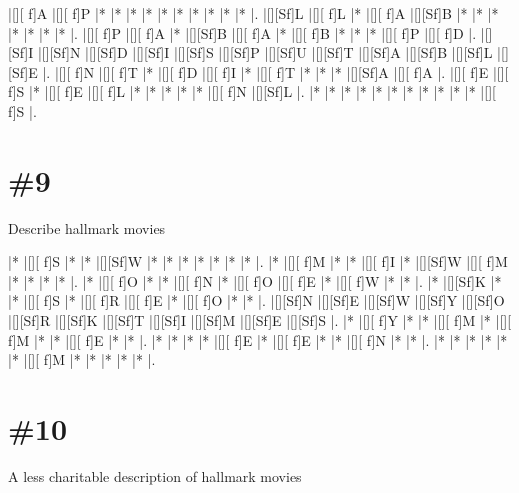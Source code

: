 \documentclass[letterpaper]{article}
\begin{document}
\vspace*{1em}
\begin{Puzzle}{12}{7}
|[][ f]A  |[][ f]P  |*        |*        |*        |*        |*        |*        |*        |*        |*        |*        |.  
|[][Sf]L  |[][ f]L  |*        |[][ f]A  |[][Sf]B  |*        |*        |*        |*        |*        |*        |*        |.
|[][ f]P  |[][ f]A  |*        |[][Sf]B  |[][ f]A  |*        |[][ f]B  |*        |*        |*        |[][ f]P  |[][ f]D  |.  
|[][Sf]I  |[][Sf]N  |[][Sf]D  |[][Sf]I  |[][Sf]S  |[][Sf]P  |[][Sf]U  |[][Sf]T  |[][Sf]A  |[][Sf]B  |[][Sf]L  |[][Sf]E  |.
|[][ f]N  |[][ f]T  |*        |[][ f]D  |[][ f]I  |*        |[][ f]T  |*        |*        |*        |[][Sf]A  |[][ f]A  |. 
|[][ f]E  |[][ f]S  |*        |[][ f]E  |[][ f]L  |*        |*        |*        |*        |*        |[][ f]N  |[][Sf]L  |.
|*        |*        |*        |*        |*        |*        |*        |*        |*        |*        |*        |[][ f]S  |.
\end{Puzzle}

\section*{\#9}
Describe hallmark movies

\vspace*{1em}
\begin{Puzzle}{12}{8}
|*        |[][ f]S  |*        |*        |[][Sf]W  |*        |*        |*        |*        |*        |*        |*        |.
|*        |[][ f]M  |*        |*        |[][ f]I  |*        |[][Sf]W  |[][ f]M  |*        |*        |*        |*        |.
|*        |[][ f]O  |*        |*        |[][ f]N  |*        |[][ f]O  |[][ f]E  |*        |[][ f]W  |*        |*        |.
|*        |[][Sf]K  |*        |*        |[][ f]S  |*        |[][ f]R  |[][ f]E  |*        |[][ f]O  |*        |*        |.
|[][Sf]N  |[][Sf]E  |[][Sf]W  |[][Sf]Y  |[][Sf]O  |[][Sf]R  |[][Sf]K  |[][Sf]T  |[][Sf]I  |[][Sf]M  |[][Sf]E  |[][Sf]S  |.
|*        |[][ f]Y  |*        |*        |[][ f]M  |*        |[][ f]M  |*        |*        |[][ f]E  |*        |*        |.
|*        |*        |*        |*        |[][ f]E  |*        |[][ f]E  |*        |*        |[][ f]N  |*        |*        |.
|*        |*        |*        |*        |*        |*        |[][ f]M  |*        |*        |*        |*        |*        |.
\end{Puzzle}

\section*{\#10}
A less charitable description of hallmark movies
\end{document}
